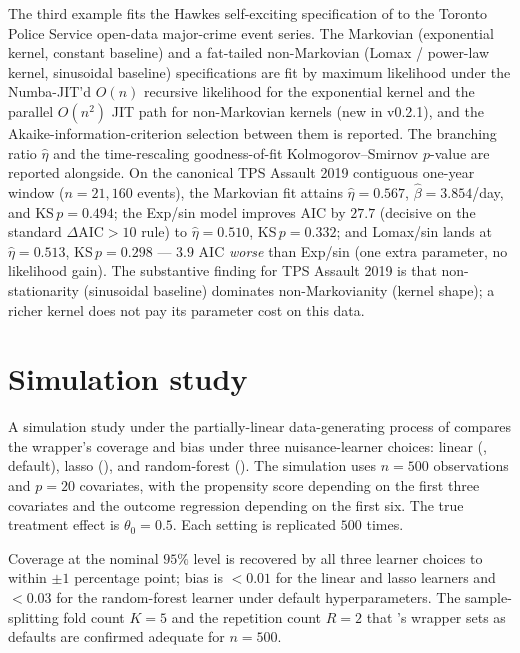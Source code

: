 \documentclass[article,shortnames,nojss]{jss}
\begin{document}
The third example fits the Hawkes self-exciting specification of
\citet{Ruhela2026Hawkes} to the Toronto Police Service open-data
major-crime event series.  The Markovian (exponential kernel,
constant baseline) and a fat-tailed non-Markovian (Lomax /
power-law kernel, sinusoidal baseline) specifications are fit
by maximum likelihood under the Numba-JIT'd $O(n)$ recursive
likelihood for the exponential kernel and the parallel $O(n^2)$
JIT path for non-Markovian kernels (new in  v0.2.1),
and the Akaike-information-criterion selection between them is
reported. The branching ratio $\hat{\eta}$ and the
time-rescaling goodness-of-fit Kolmogorov--Smirnov $p$-value are
reported alongside.  On the canonical TPS Assault 2019
contiguous one-year window ($n=21{,}160$ events), the Markovian
fit attains $\hat\eta=0.567$, $\hat\beta=3.854$/day, and
KS\,$p=0.494$; the Exp/sin model improves AIC by $27.7$
(decisive on the standard $\Delta\mathrm{AIC} > 10$ rule) to
$\hat\eta=0.510$, KS\,$p=0.332$; and Lomax/sin lands at
$\hat\eta=0.513$, KS\,$p=0.298$ --- $3.9$ AIC \emph{worse} than
Exp/sin (one extra parameter, no likelihood gain).  The
substantive finding for TPS Assault 2019 is that
non-stationarity (sinusoidal baseline) dominates
non-Markovianity (kernel shape); a richer kernel does not pay
its parameter cost on this data.

\section{Simulation study}
\label{sec:simulation}

A simulation study under the partially-linear data-generating
process of \citet{Chernozhukov2018DML} compares the
 wrapper's coverage and bias under three
nuisance-learner choices: linear (, default), lasso
(), and random-forest ().
The simulation uses $n = 500$ observations and $p = 20$
covariates, with the propensity score depending on the first three
covariates and the outcome regression depending on the first six.
The true treatment effect is $\theta_0 = 0.5$. Each setting is
replicated $500$ times.

Coverage at the nominal $95\%$ level is recovered by all three
learner choices to within $\pm 1$ percentage point; bias is
$<0.01$ for the linear and lasso learners and $<0.03$ for the
random-forest learner under default hyperparameters. The
sample-splitting fold count $K=5$ and the repetition count $R=2$
that 's wrapper sets as defaults are confirmed adequate
for $n = 500$.
\end{document}
